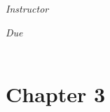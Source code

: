 \documentclass[12pt, oneside]{book}
\begin{document}
\begin{titlepage}
\begin{center}
\begin{large}
            \textit{Instructor} \\[1ex] %
            \professor

            \vspace*{1\baselineskip}

            \textit{Due}\\[1ex]
            {\scshape  \finaldate} \\[0.3\baselineskip] %

            \thispagestyle{empty}

        \end{large}
    \end{center}
\end{titlepage}


\section*{Chapter 3}
\end{document}
